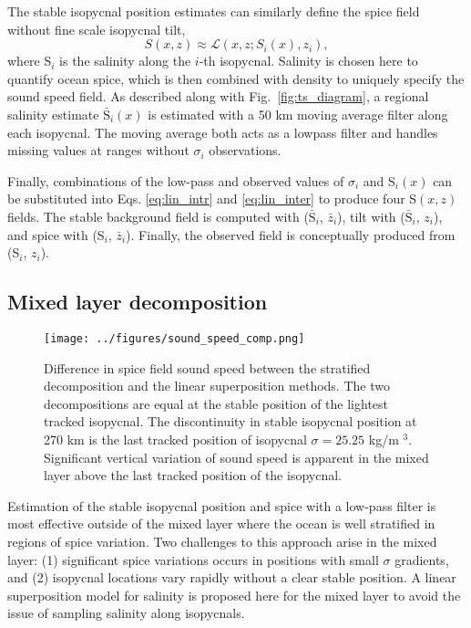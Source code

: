 \documentclass[preprint,NumberedRefs]{JASA}
\begin{document}
The stable isopycnal position estimates can similarly define the spice field without fine scale isopycnal tilt,
\begin{equation}
    S(x, z)\approx\mathcal{L}(x, z; S_i(x), z_i),
    \label{eq:lin_inter}
\end{equation}
where S$_i$ is the salinity along the $i$-th isopycnal. Salinity is chosen here to quantify ocean spice, which is then combined with density to uniquely specify the sound speed field\citep{TEOS10}. As described along with Fig.~\ref{fig:ts_diagram}, a regional salinity estimate $\bar{\textrm{S}}_i(x)$ is estimated with a 50 km moving average filter along each isopycnal. The moving average both acts as a lowpass filter and handles missing values at ranges without $\sigma_i$ observations.

Finally, combinations of the low-pass and observed values of $\sigma_i$ and S$_i(x)$ can be substituted into Eqs. \eqref{eq:lin_intr} and \eqref{eq:lin_inter} to produce four S$(x,z)$ fields. The stable background field is computed with ($\bar{\textrm{S}}_i$, $\bar{z}_i$), tilt with ($\bar{\textrm{S}}_i$, $z_i$), and spice with (S$_i$, $\bar{z}_i$). Finally, the observed field is conceptually produced from (S$_i$, $z_i$).

\subsection{Mixed layer decomposition}\label{ssec:ml_decomp}
\begin{figure}
\texttt{[image: ../figures/sound\_speed\_comp.png]}
    \caption{\label{fig:c_diff}{Difference in spice field sound speed between the stratified decomposition and the linear superposition methods. The two decompositions are equal at the stable position of the lightest tracked isopycnal. The discontinuity in stable isopycnal position at 270 km is the last tracked position of isopycnal $\sigma=25.25$ kg/m $^3$. Significant vertical variation of sound speed is apparent in the mixed layer above the last tracked position of the isopycnal.}}
\end{figure}

Estimation of the stable isopycnal position and spice with a low-pass filter is most effective outside of the mixed layer where the ocean is well stratified in regions of spice variation. Two challenges to this approach arise in the mixed layer: (1) significant spice variations occurs in positions with small $\sigma$ gradients, and (2) isopycnal locations vary rapidly without a clear stable position. A linear superposition model for salinity is proposed here for the mixed layer to avoid the issue of sampling salinity along isopycnals.
\end{document}
